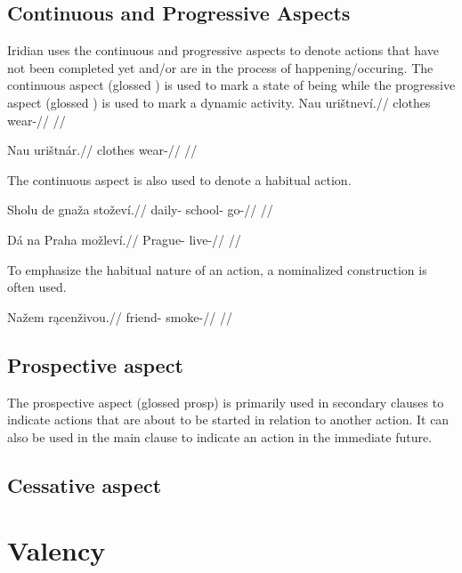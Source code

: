 \subsection{Continuous and Progressive Aspects}
Iridian uses the continuous and progressive aspects to denote actions that have not been completed yet and/or are in the process of happening/occuring. The continuous aspect (glossed ) is used to mark a state of being while the progressive aspect (glossed ) is used to mark a dynamic activity.
\pex
\begingl
\gla Nau uri\v{s}tnev\'i.//
\glb clothes wear-//
\glft {} //
\endgl
\xe

\pex
\begingl
\gla Nau uri\v{s}tn\'ar.//
\glb clothes wear-//
\glft {} //
\endgl
\xe

The continuous aspect is also used to denote a habitual action.

\pex
\begingl
\gla Sholu de gna\v{z}a sto\v{z}ev\'i.//
\glb daily-  school- go-//
\glft {} //
\endgl
\xe

\pex
\begingl
\gla D\'a na Praha mo\v{z}lev\'i.//
\glb {}  Prague- live-//
\glft {} //
\endgl
\xe

To emphasize the habitual nature of an action, a nominalized construction is often used.

\pex
\begingl
\gla Na\v{z}em r\k{a}cen\v{z}ivou.//
\glb friend- smoke-//
\glft {} //
\endgl
\xe

\subsection{Prospective aspect}
\par The prospective aspect (glossed {\sc prosp}) is primarily used in secondary clauses to indicate actions that are about to be started in relation to another action. It can also be used in the main clause to indicate an action in the immediate future.

\subsection{Cessative aspect}

\section{Valency}

